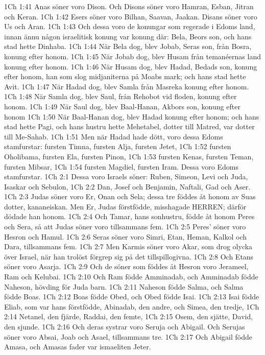 1Ch 1:41  Anas söner voro Dison. Och Disons söner voro Hamran, Esban, Jitran och Keran.
1Ch 1:42  Esers söner voro Bilhan, Saavan, Jaakan. Disans söner voro Us och Aran.
1Ch 1:43  Och dessa voro de konungar som regerade i Edoms land, innan ännu någon israelitisk konung var konung där: Bela, Beors son, och hans stad hette Dinhaba.
1Ch 1:44  När Bela dog, blev Jobab, Seras son, från Bosra, konung efter honom.
1Ch 1:45  När Jobab dog, blev Husam från temanéernas land konung efter honom.
1Ch 1:46  När Husam dog, blev Hadad, Bedads son, konung efter honom, han som slog midjaniterna på Moabs mark; och hans stad hette Avit.
1Ch 1:47  När Hadad dog, blev Samla från Masreka konung efter honom.
1Ch 1:48  När Samla dog, blev Saul, från Rehobot vid floden, konung efter honom.
1Ch 1:49  När Saul dog, blev Baal-Hanan, Akbors son, konung efter honom
1Ch 1:50  När Baal-Hanan dog, blev Hadad konung efter honom; och hans stad hette Pagi, och hans hustru hette Mehetabel, dotter till Matred, var dotter till Me-Sahab.
1Ch 1:51  Men när Hadad hade dött, voro dessa Edoms stamfurstar: fursten Timna, fursten Alja, fursten Jetet,
1Ch 1:52  fursten Oholibama, fursten Ela, fursten Pinon,
1Ch 1:53  fursten Kenas, fursten Teman, fursten Mibsar,
1Ch 1:54  fursten Magdiel, fursten Iram. Dessa voro Edoms stamfurstar.
1Ch 2:1  Dessa voro Israels söner: Ruben, Simeon, Levi och Juda, Isaskar och Sebulon,
1Ch 2:2  Dan, Josef och Benjamin, Naftali, Gad och Aser.
1Ch 2:3  Judas söner voro Er, Onan och Sela; dessa tre föddes åt honom av Suas dotter, kananeiskan. Men Er, Judas förstfödde, misshagade HERREN; därför dödade han honom.
1Ch 2:4  Och Tamar, hans sonhustru, födde åt honom Peres och Sera, så att Judas söner voro tillsammans fem.
1Ch 2:5  Peres' söner voro Hesron och Hamul.
1Ch 2:6  Seras söner voro Simri, Etan, Heman, Kalkol och Dara, tillsammans fem.
1Ch 2:7  Men Karmis söner voro Akar, som drog olycka över Israel, när han trolöst förgrep sig på det tillspillogivna.
1Ch 2:8  Och Etans söner voro Asarja.
1Ch 2:9  Och de söner som föddes åt Hesron voro Jerameel, Ram och Kelubai.
1Ch 2:10  Och Ram födde Amminadab, och Amminadab födde Naheson, hövding för Juda barn.
1Ch 2:11  Naheson födde Salma, och Salma födde Boas.
1Ch 2:12  Boas födde Obed, och Obed födde Isai.
1Ch 2:13  Isai födde Eliab, som var hans förstfödde, Abinadab, den andre, och Simea, den tredje,
1Ch 2:14  Netanel, den fjärde, Raddai, den femte,
1Ch 2:15  Osem, den sjätte, David, den sjunde.
1Ch 2:16  Och deras systrar voro Seruja och Abigail. Och Serujas söner voro Absai, Joab och Asael, tillsammans tre.
1Ch 2:17  Och Abigail födde Amasa, och Amasas fader var ismaeliten Jeter.
